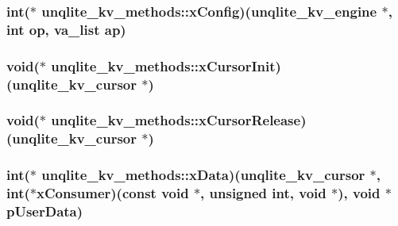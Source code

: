 \hypertarget{structunqlite__kv__methods_aba801d097e9151daa9f83bd721b10856}{
\subsubsection[{x\-Config}]{\setlength{\rightskip}{0pt plus 5cm}int($\ast$ unqlite\-\_\-kv\-\_\-methods\-::x\-Config)({\bf unqlite\-\_\-kv\-\_\-engine} $\ast$, int op, va\-\_\-list ap)}}\label{d2/dfb/structunqlite__kv__methods_aba801d097e9151daa9f83bd721b10856}
\hypertarget{structunqlite__kv__methods_a89a88a0ec7164b2529d282a8ae1bbd21}{
\subsubsection[{x\-Cursor\-Init}]{\setlength{\rightskip}{0pt plus 5cm}void($\ast$ unqlite\-\_\-kv\-\_\-methods\-::x\-Cursor\-Init)({\bf unqlite\-\_\-kv\-\_\-cursor} $\ast$)}}\label{d2/dfb/structunqlite__kv__methods_a89a88a0ec7164b2529d282a8ae1bbd21}
\hypertarget{structunqlite__kv__methods_adfbe1442892b629325824f5d6293d9a8}{
\subsubsection[{x\-Cursor\-Release}]{\setlength{\rightskip}{0pt plus 5cm}void($\ast$ unqlite\-\_\-kv\-\_\-methods\-::x\-Cursor\-Release)({\bf unqlite\-\_\-kv\-\_\-cursor} $\ast$)}}\label{d2/dfb/structunqlite__kv__methods_adfbe1442892b629325824f5d6293d9a8}
\hypertarget{structunqlite__kv__methods_a15ce394652fbe105de86b93a63f04053}{
\subsubsection[{x\-Data}]{\setlength{\rightskip}{0pt plus 5cm}int($\ast$ unqlite\-\_\-kv\-\_\-methods\-::x\-Data)({\bf unqlite\-\_\-kv\-\_\-cursor} $\ast$, int($\ast$x\-Consumer)(const void $\ast$, unsigned int, void $\ast$), void $\ast$p\-User\-Data)}}\label{d2/dfb/structunqlite__kv__methods_a15ce394652fbe105de86b93a63f04053}
